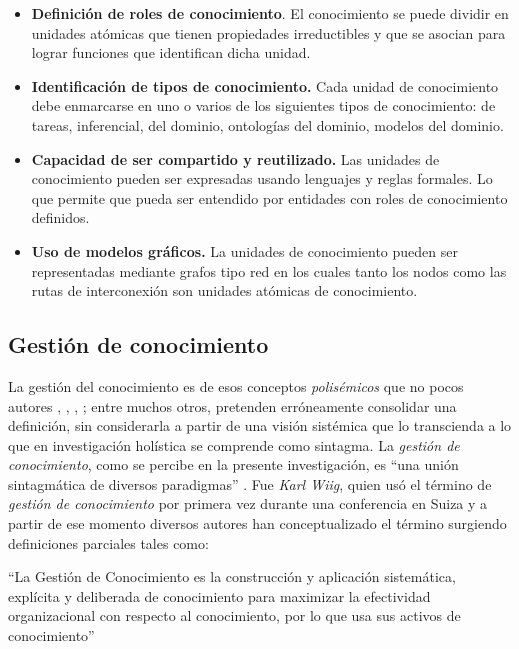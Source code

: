 \begin{itemize}
\item \textbf{Definición de roles de conocimiento}. El conocimiento se puede dividir en unidades atómicas que tienen propiedades irreductibles y que se asocian para lograr funciones que identifican dicha unidad.

\item \textbf{Identificación de tipos de conocimiento.} Cada unidad de conocimiento debe enmarcarse en uno o varios de los siguientes tipos de conocimiento: de tareas, inferencial, del dominio, ontologías del dominio, modelos del dominio. 

\item \textbf{Capacidad de ser compartido y reutilizado.} Las unidades de conocimiento pueden ser expresadas usando lenguajes y reglas formales. Lo que permite que pueda ser entendido por entidades con roles de conocimiento definidos.

\item \textbf{Uso de modelos gráficos.} La unidades de conocimiento pueden ser representadas mediante grafos tipo red en los cuales tanto los nodos como las rutas de interconexión son unidades atómicas de conocimiento.
\end{itemize}


\subsection{Gestión de conocimiento}

La gestión del conocimiento es de esos conceptos \textit{polisémicos} que no pocos autores \cite{girard2015}, \cite{firestone2001}, \cite{bergeron2003}, \cite{davenport1998}; entre muchos otros, pretenden erróneamente consolidar una definición, sin considerarla a partir de una visión sistémica que lo transcienda a lo que en investigación holística se comprende como sintagma\cite{hurtado2000}. La \textit{gestión de conocimiento}, como se percibe en la presente investigación, es “una unión sintagmática de diversos paradigmas” \cite{hurtado2000}. Fue \textit{Karl Wiig}, quien usó el término de \textit{gestión de conocimiento} por primera vez durante una conferencia en Suiza y a partir de ese momento diversos autores han conceptualizado el término surgiendo definiciones parciales tales como:

“La Gestión de Conocimiento es la construcción y aplicación sistemática, explícita y deliberada de conocimiento para maximizar la efectividad organizacional con respecto al conocimiento, por lo que usa sus activos de conocimiento”\cite{wiig1993}

